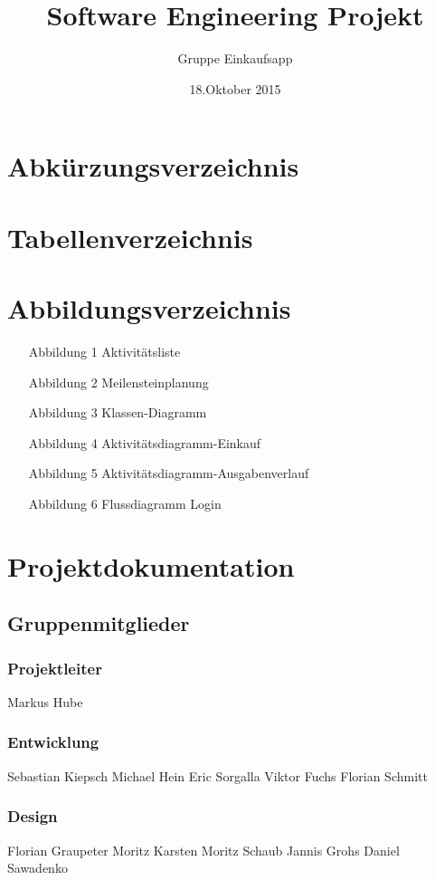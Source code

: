 \documentclass[12pt,a4paper]{article}
\begin{document}
\title{Software Engineering Projekt}
\author{Gruppe Einkaufsapp}
\date {18.Oktober 2015}
\maketitle
\newpage
\tableofcontents
\newpage
\newpage
\section*{Abkürzungsverzeichnis}
\newpage
\section*{Tabellenverzeichnis}
\newpage
\section*{Abbildungsverzeichnis}
\begin{itemize}
\item[Abbildung 1] Aktivitätsliste
\item[Abbildung 2] Meilensteinplanung
\item[Abbildung 3] Klassen-Diagramm
\item[Abbildung 4] Aktivitätsdiagramm-Einkauf
\item[Abbildung 5] Aktivitätsdiagramm-Ausgabenverlauf
\item[Abbildung 6] Flussdiagramm Login
\end{itemize}
\newpage
\section*{Projektdokumentation}
\subsection*{Gruppenmitglieder}
\subsubsection*{Projektleiter}
Markus Hube
\subsubsection*{Entwicklung}
Sebastian Kiepsch
\newline
Michael Hein
\newline
Eric Sorgalla
\newline
Viktor Fuchs
\newline
Florian Schmitt 
\subsubsection*{Design}
Florian Graupeter
\newline
Moritz Karsten
\newline
Moritz Schaub
\newline
Jannis Grohs
\newline
Daniel Sawadenko 
\end{document}
